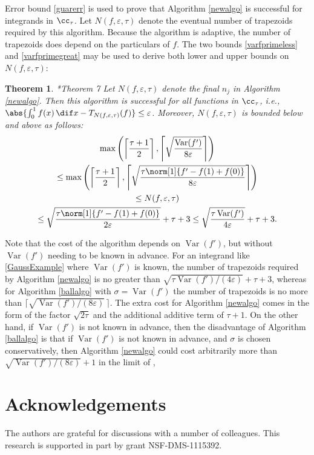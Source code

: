 \documentclass[]{amsart}
\DeclareMathOperator{\Var}{Var}
\newtheorem{theorem}{Theorem}
\theoremstyle{definition}
\theoremstyle{remark}
\begin{document}
Error bound \eqref{guarerr} is used to prove that Algorithm \ref{newalgo} is successful for integrands in $\cc_{\tau}$.  Let $N(f,\varepsilon,\tau)$ denote the eventual number of trapezoids required by this algorithm.  Because the algorithm is adaptive, the number of trapezoids does depend on the particulars of $f$.  The two bounds \eqref{varfprimeless} and \eqref{varfprimegreat} may be used to derive both lower and upper bounds on $N(f,\varepsilon,\tau)$:

\begin{theorem}\cite{HicEtal14b}*{Theorem 7} \label{newalgothm}
Let $N(f,\varepsilon,\tau)$ denote the final $n_j$ in Algorithm \ref{newalgo}.  Then this algorithm is successful for all functions in $\cc_{\tau}$,  i.e.,  $\abs{\int_0^1 f(x) \, \dif x - T_{N(f,\varepsilon,\tau)}(f)} \le \varepsilon$.  Moreover, $N(f,\varepsilon,\tau)$ is bounded below and above as follows:
\begin{multline}
\max \left(\left \lceil\frac{\tau+1}{2} \right \rceil, \left \lceil \sqrt{\frac{ \Var(f')}{8\varepsilon}} \right \rceil \right) \\
\le \max \left(\left \lceil\frac{\tau+1}{2} \right \rceil, \left \lceil \sqrt{\frac{\tau \norm[1]{f'-f(1)+f(0)}}{8\varepsilon}} \right \rceil \right) \\
\le
N(f,\varepsilon,\tau) \\
\le \sqrt{\frac{\tau \norm[1]{f'-f(1)+f(0)}}{2\varepsilon}} + \tau + 3
\le \sqrt{\frac{\tau \Var(f') }{4\varepsilon}} + \tau + 3.
\end{multline}
\end{theorem}

Note that the cost of the algorithm depends on $\Var(f')$, but without $\Var(f')$ needing to be known in advance. For an integrand like \eqref{GaussExample} where $\Var(f')$ is known, the number of trapezoids required by Algorithm \ref{newalgo} is no greater than  $\sqrt{\tau \Var(f') /(4\varepsilon)} + \tau + 3$, whereas for Algorithm \ref{ballalgo} with $\sigma=\Var(f')$ the number of trapezoids is no more than $\bigl \lceil \sqrt{\Var(f') /(8\varepsilon)} \, \bigr\rceil$.  The extra cost for Algorithm \ref{newalgo} comes in the form of the factor $\sqrt{2\tau}$ and the additional additive term of $\tau+1$.  On the other hand, if $\Var(f')$ is not known in advance, then the disadvantage of Algorithm  \ref{ballalgo} is that if $\Var(f')$ is not known in advance, and $\sigma$ is chosen conservatively, then Algorithm \ref{newalgo} could cost arbitrarily more than $\sqrt{\Var(f') /(8\varepsilon)}+1$ in the limit of , 

\section{Acknowledgements}  The authors are grateful for discussions with a number of colleagues. This research is supported in part by grant NSF-DMS-1115392.


\end{document}
